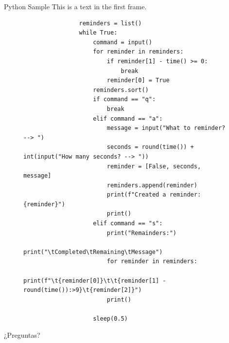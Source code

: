 \documentclass{beamer}
\begin{document}
    \begin{frame}[fragile]{Python Sample}
        This is a text in the first frame.
        \begin{figure}
            \begin{minipage}[c]{\textwidth}
                \begin{verbatim}
                reminders = list()
                while True:
                    command = input()
                    for reminder in reminders:
                        if reminder[1] - time() >= 0:
                            break
                        reminder[0] = True
                    reminders.sort()
                    if command == "q":
                        break
                    elif command == "a":
                        message = input("What to reminder? --> ")
                        seconds = round(time()) + int(input("How many seconds? --> "))
                        reminder = [False, seconds, message]
                        reminders.append(reminder)
                        print(f"Created a reminder: {reminder}")
                        print()
                    elif command == "s":
                        print("Remainders:")
                        print("\tCompleted\tRemaining\tMessage")
                        for reminder in reminders:
                            print(f"\t{reminder[0]}\t\t{reminder[1] - round(time()):>9}\t{reminder[2]}")
                        print()

                    sleep(0.5)
                \end{verbatim}
            \end{minipage}
        \end{figure}
    \end{frame}

    \begin{frame}
        \begin{center}
            \Huge
            ¿Preguntas?
        \end{center}
    \end{frame}
\end{document}
